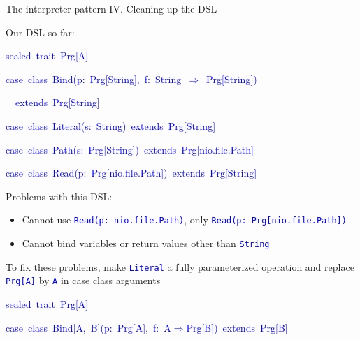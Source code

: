 \documentclass[english,,russian]{beamer}
\newenvironment{lyxcode}
  {\par\begin{list}{}{
    \setlength{\rightmargin}{\leftmargin}
    \setlength{\listparindent}{0pt}%
    \raggedright
    \setlength{\itemsep}{0pt}
    \setlength{\parsep}{0pt}
    \normalfont\ttfamily}%
   \def\{{\char`\{}
   \def\}{\char`\}}
   \def\textasciitilde{\char`\~}
   \item[]}
  {\end{list}}
\begin{document}
\begin{frame}{The interpreter pattern IV. Cleaning up the DSL}

\vspace{-0.2cm}Our DSL so far:
\begin{lyxcode}
\vspace{-0.0cm}\textcolor{blue}{\footnotesize{}sealed~trait~Prg{[}A{]}}{\footnotesize\par}

\textcolor{blue}{\footnotesize{}case~class~Bind(p:~Prg{[}String{]},~f:~String~$\Rightarrow$~Prg{[}String{]})}{\footnotesize\par}

\textcolor{blue}{\footnotesize{}~~extends~Prg{[}String{]}}{\footnotesize\par}

\textcolor{blue}{\footnotesize{}case~class~Literal(s:~String)~extends~Prg{[}String{]}}{\footnotesize\par}

\textcolor{blue}{\footnotesize{}case~class~Path(s:~Prg{[}String{]})~extends~Prg{[}nio.file.Path{]}}{\footnotesize\par}

\textcolor{blue}{\footnotesize{}case~class~Read(p:~Prg{[}nio.file.Path{]})~extends~Prg{[}String{]}}{\footnotesize\par}
\end{lyxcode}
Problems with this DSL:
\begin{itemize}
\item Cannot use \texttt{\textcolor{blue}{\footnotesize{}Read(p: nio.file.Path)}},
only \texttt{\textcolor{blue}{\footnotesize{}Read(p: Prg{[}nio.file.Path{]})}} 
\item Cannot bind variables or return values other than \texttt{\textcolor{blue}{\footnotesize{}String}} 
\end{itemize}
To fix these problems, make \texttt{\textcolor{blue}{\footnotesize{}Literal}}
a fully parameterized operation and replace \texttt{\textcolor{blue}{\footnotesize{}Prg{[}A{]}}}
by \texttt{\textcolor{blue}{\footnotesize{}A}} in case class arguments
\begin{lyxcode}
\textcolor{blue}{\footnotesize{}sealed~trait~Prg{[}A{]}}{\footnotesize\par}

\textcolor{blue}{\footnotesize{}case~class~Bind{[}A,~B{]}(p:~Prg{[}A{]},~f:~A$\Rightarrow$Prg{[}B{]})~extends~Prg{[}B{]}}{\footnotesize\par}


\end{lyxcode}
\end{frame}
\end{document}
